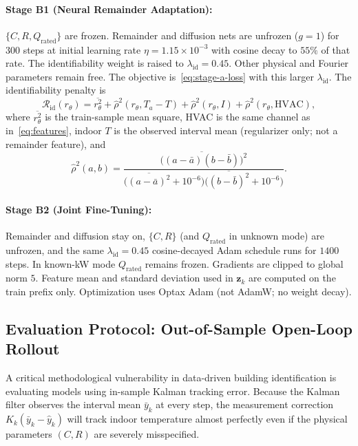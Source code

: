 \documentclass[11pt,letterpaper]{article}
\begin{document}
\paragraph{Stage B1 (Neural Remainder Adaptation):} $\{C, R, Q_\mathrm{rated}\}$ are frozen. Remainder and diffusion nets are unfrozen ($g=1$) for $300$ steps at initial learning rate $\eta=1.15\times 10^{-3}$ with cosine decay to $55\%$ of that rate. The identifiability weight is raised to $\lambda_\mathrm{id}=0.45$. Other physical and Fourier parameters remain free. The objective is~\eqref{eq:stage-a-loss} with this larger $\lambda_\mathrm{id}$. The identifiability penalty is
\begin{equation}
\label{eq:ident-penalty}
\mathcal{R}_\mathrm{id}(r_\theta) = \overline{r_\theta^2} + \widehat{\rho}^2(r_\theta, T_a - T) + \widehat{\rho}^2(r_\theta, I) + \widehat{\rho}^2(r_\theta, \mathrm{HVAC}),
\end{equation}
where $\overline{r_\theta^2}$ is the train-sample mean square, HVAC is the same channel as in~\eqref{eq:features}, indoor $T$ is the observed interval mean (regularizer only; not a remainder feature), and
\begin{equation}
\label{eq:corr2}
\widehat{\rho}^2(a,b)=\frac{\bigl(\overline{(a-\bar a)(b-\bar b)}\bigr)^2}{\bigl(\overline{(a-\bar a)^2}+10^{-6}\bigr)\bigl(\overline{(b-\bar b)^2}+10^{-6}\bigr)}.
\end{equation}

\paragraph{Stage B2 (Joint Fine-Tuning):} Remainder and diffusion stay on, $\{C,R\}$ (and $Q_\mathrm{rated}$ in unknown mode) are unfrozen, and the same $\lambda_\mathrm{id}=0.45$ cosine-decayed Adam schedule runs for $1400$ steps. In known-kW mode $Q_\mathrm{rated}$ remains frozen. Gradients are clipped to global norm $5$. Feature mean and standard deviation used in $\bm{z}_k$ are computed on the train prefix only. Optimization uses Optax Adam (not AdamW; no weight decay).

\subsection{Evaluation Protocol: Out-of-Sample Open-Loop Rollout}
\label{sec:id-protocol}
A critical methodological vulnerability in data-driven building identification is evaluating models using in-sample Kalman tracking error. Because the Kalman filter observes the interval mean $\bar{y}_k$ at every step, the measurement correction $K_k(\bar{y}_k - \hat{y}_k)$ will track indoor temperature almost perfectly even if the physical parameters $(C, R)$ are severely misspecified.
\end{document}
